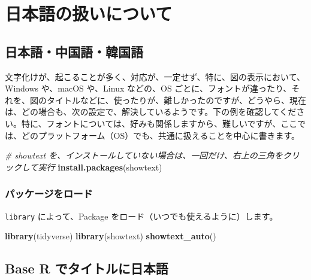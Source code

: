 \documentclass[
  xelatex, ja=standard]{bxjsbook}
\newenvironment{Shaded}{\begin{snugshade}}{\end{snugshade}}
\newcommand{\CommentTok}[1]{\textcolor[rgb]{0.56,0.35,0.01}{\textit{#1}}}
\newcommand{\FunctionTok}[1]{\textcolor[rgb]{0.13,0.29,0.53}{\textbf{#1}}}
\newcommand{\NormalTok}[1]{#1}
\newcommand{\StringTok}[1]{\textcolor[rgb]{0.31,0.60,0.02}{#1}}
\theoremstyle{definition}
\theoremstyle{definition}
\theoremstyle{definition}
\theoremstyle{definition}
\theoremstyle{remark}
\begin{document}
\hypertarget{japanese}{%
\chapter{日本語の扱いについて}\label{japanese}}

\hypertarget{ux65e5ux672cux8a9eux4e2dux56fdux8a9eux97d3ux56fdux8a9e}{%
\section{日本語・中国語・韓国語}\label{ux65e5ux672cux8a9eux4e2dux56fdux8a9eux97d3ux56fdux8a9e}}

文字化けが、起こることが多く、対応が、一定せず、特に、図の表示において、Windows や、macOS や、Linux などの、OS ごとに、フォントが違ったり、それを、図のタイトルなどに、使ったりが、難しかったのですが、どうやら、現在は、どの場合も、次の設定で、解決しているようです。下の例を確認してください。特に、フォントについては、好みも関係しますから、難しいですが、ここでは、どのプラットフォーム（OS）でも、共通に扱えることを中心に書きます。

\begin{Shaded}
\begin{Highlighting}[]
\CommentTok{\# showtext を、インストールしていない場合は、一回だけ、右上の三角をクリックして実行}
\FunctionTok{install.packages}\NormalTok{(}\StringTok{\textquotesingle{}showtext\textquotesingle{}}\NormalTok{)}
\end{Highlighting}
\end{Shaded}

\hypertarget{ux30d1ux30c3ux30b1ux30fcux30b8ux3092ux30edux30fcux30c9}{%
\subsection{パッケージをロード}\label{ux30d1ux30c3ux30b1ux30fcux30b8ux3092ux30edux30fcux30c9}}

\texttt{library} によって、Package をロード（いつでも使えるように）します。

\begin{Shaded}
\begin{Highlighting}[]
\FunctionTok{library}\NormalTok{(tidyverse)}
\FunctionTok{library}\NormalTok{(showtext) }
\FunctionTok{showtext\_auto}\NormalTok{()}
\end{Highlighting}
\end{Shaded}

\hypertarget{base-r-ux3067ux30bfux30a4ux30c8ux30ebux306bux65e5ux672cux8a9e}{%
\section{Base R でタイトルに日本語}\label{base-r-ux3067ux30bfux30a4ux30c8ux30ebux306bux65e5ux672cux8a9e}}
\end{document}
